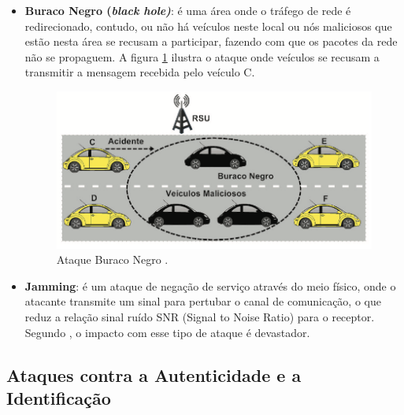 \documentclass[
	12pt,				%
	oneside,			%
	a4paper,			%
	english,			%
	brazil				%
	]{abntex2ppgsi}
\begin{document}
\begin{itemize}
	\item {\textbf{Buraco Negro (\textit{black hole)}}: é uma área onde o tráfego de rede é redirecionado, contudo, ou não há veículos neste local ou nós maliciosos que estão nesta área se recusam a participar, fazendo com que os pacotes da rede não se propaguem. A figura \ref{fig:ataguerubronegro} ilustra o ataque onde veículos se recusam a transmitir a mensagem recebida pelo veículo C.}		
	
\begin{figure}[h!]
	\centering
	\includegraphics [width=12cm] {images/ataqueburaconegro.png}
	\caption{Ataque Buraco Negro \cite{wanghamsegurancca}.}
	\label{fig:ataguerubronegro}
\end{figure}
	
	\item {\textbf{Jamming}: é um ataque de negação de serviço através do meio físico, onde o atacante transmite um sinal para pertubar o canal de comunicação, o que reduz a relação sinal ruído SNR (Signal to Noise Ratio) para o receptor. Segundo  , o impacto com esse tipo de ataque é devastador.}			
\end{itemize}

\subsection{Ataques contra a Autenticidade e a Identificação}
\end{document}
